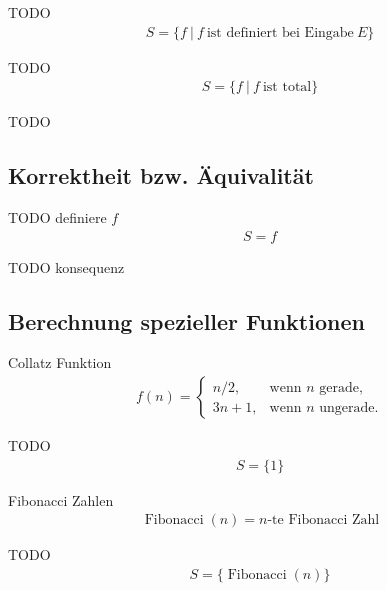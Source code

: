 \documentclass[journal]{IEEEtran}
\begin{document}
TODO
\begin{align*}
S = \{ f \ \vert \ f \ \text{ist definiert bei Eingabe} \ E \}
\end{align*}

TODO
\begin{align*}
S = \{ f \ \vert \ f \ \text{ist total} \}
\end{align*}

TODO

\subsection{Korrektheit bzw. Äquivalität}

TODO definiere $f$
\begin{align*}
S = {f}
\end{align*}

TODO konsequenz

\subsection{Berechnung spezieller Funktionen}

Collatz Funktion
\begin{align*}
  f(n)=\begin{cases}
  n/2,  & \text{wenn }n\text{ gerade,}\\
  3n+1, & \text{wenn }n\text{ ungerade.}
\end{cases}
\end{align*}

TODO
\begin{align*}
S = \{ 1 \}
\end{align*}



Fibonacci Zahlen
\begin{align*}
\operatorname{Fibonacci}(n) = n \text{-te Fibonacci Zahl}
\end{align*}

TODO
\begin{align*}
S = \{ \operatorname{Fibonacci}(n) \}
\end{align*}








\end{document}
